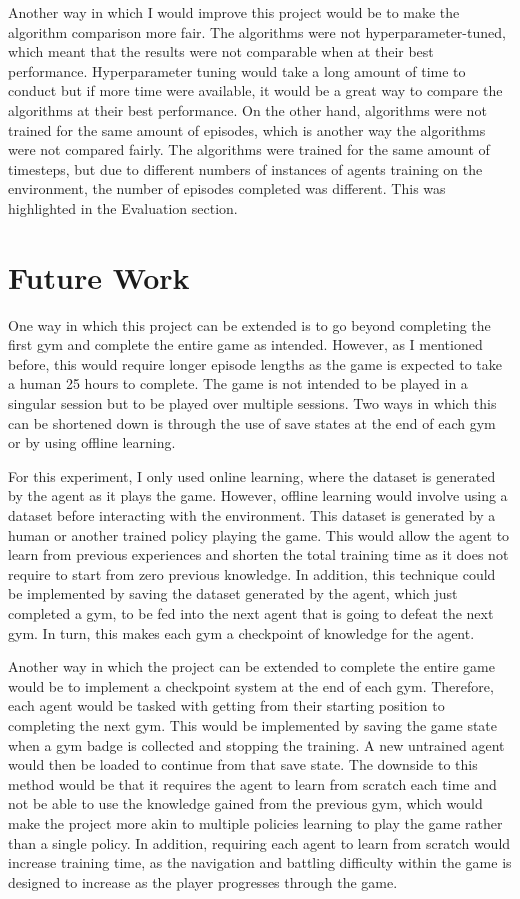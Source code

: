Another way in which I would improve this project would be to make the algorithm comparison more fair. The algorithms were not hyperparameter-tuned, which meant that the results were not comparable when at their best performance. Hyperparameter tuning would take a long amount of time to conduct but if more time were available, it would be a great way to compare the algorithms at their best performance. On the other hand, algorithms were not trained for the same amount of episodes, which is another way the algorithms were not compared fairly. The algorithms were trained for the same amount of timesteps, but due to different numbers of instances of agents training on the environment, the number of episodes completed was different. This was highlighted in the Evaluation section.

\newpage

\section{Future Work}

One way in which this project can be extended is to go beyond completing the first gym and complete the entire game as intended. However, as I mentioned before, this would require longer episode lengths as the game is expected to take a human 25 hours to complete. The game is not intended to be played in a singular session but to be played over multiple sessions. Two ways in which this can be shortened down is through the use of save states at the end of each gym or by using offline learning. 

For this experiment, I only used online learning, where the dataset is generated by the agent as it plays the game. However, offline learning would involve using a dataset before interacting with the environment. This dataset is generated by a human or another trained policy playing the game. This would allow the agent to learn from previous experiences and shorten the total training time as it does not require to start from zero previous knowledge. In addition, this technique could be implemented by saving the dataset generated by the agent, which just completed a gym, to be fed into the next agent that is going to defeat the next gym. In turn, this makes each gym a checkpoint of knowledge for the agent. 

Another way in which the project can be extended to complete the entire game would be to implement a checkpoint system at the end of each gym. Therefore, each agent would be tasked with getting from their starting position to completing the next gym. This would be implemented by saving the game state when a gym badge is collected and stopping the training. A new untrained agent would then be loaded to continue from that save state. The downside to this method would be that it requires the agent to learn from scratch each time and not be able to use the knowledge gained from the previous gym, which would make the project more akin to multiple policies learning to play the game rather than a single policy. In addition, requiring each agent to learn from scratch would increase training time, as the navigation and battling difficulty within the game is designed to increase as the player progresses through the game.

